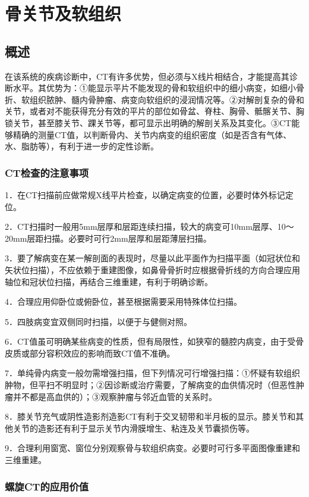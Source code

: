 \chapter{骨关节及软组织}

\section{概述}

在该系统的疾病诊断中，CT有许多优势，但必须与X线片相结合，才能提高其诊断水平。其优势为：①能显示平片不能发现的骨和软组织中的细小病变，如细小骨折、软组织脓肿、髓内骨肿瘤、病变向软组织的浸润情况等。②对解剖复杂的骨和关节，或者对不能获得充分有效的平片的部位如骨盆、脊柱、胸骨、骶髂关节、胸锁关节，甚至膝关节、踝关节等，都可显示出明确的解剖关系及其变化。③CT能够精确的测量CT值，以判断骨内、关节内病变的组织密度（如是否含有气体、水、脂肪等），有利于进一步的定性诊断。

\subsection{CT检查的注意事项}

1．在CT扫描前应做常规X线平片检查，以确定病变的位置，必要时体外标记定位。

2．CT扫描时一般用5mm层厚和层距连续扫描，较大的病变可10mm层厚、10～20mm层距扫描。必要时可行2mm层厚和层距薄层扫描。

3．要了解病变在某一解剖面的表现时，尽量以此平面作为扫描平面（如冠状位和矢状位扫描），不应依赖于重建图像，如鼻骨骨折时应根据骨折线的方向合理应用轴位和冠状位扫描，再结合三维重建，有利于明确诊断。

4．合理应用仰卧位或俯卧位，甚至根据需要采用特殊体位扫描。

5．四肢病变宜双侧同时扫描，以便于与健侧对照。

6．CT值虽可明确某些病变的性质，但有局限性，如狭窄的髓腔内病变，由于受骨皮质或部分容积效应的影响而致CT值不准确。

7．单纯骨内病变一般勿需增强扫描，但下列情况可行增强扫描：①怀疑有软组织肿物，但平扫不明显时；②因诊断或治疗需要，了解病变的血供情况时（但恶性肿瘤并不都是高血供的）；③观察肿瘤与邻近血管的关系时。

8．膝关节充气或阴性造影剂造影CT有利于交叉韧带和半月板的显示。膝关节和其他关节的造影还有利于显示关节内滑膜增生、粘连及关节囊损伤等。

9．合理利用窗宽、窗位分别观察骨与软组织病变。必要时可行多平面图像重建和三维重建。

\subsection{螺旋CT的应用价值}

